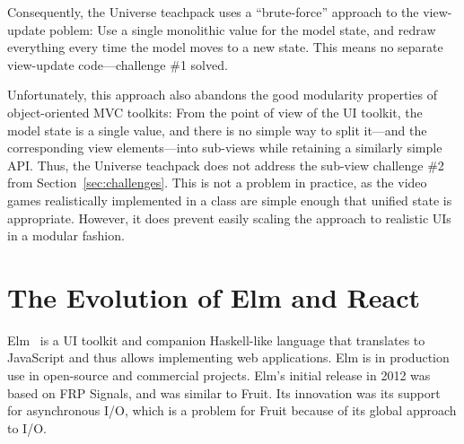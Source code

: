 \documentclass[sigplan,review,screen]{acmart}
\begin{document}
Consequently, the Universe teachpack uses a ``brute-force'' approach
to the view-update poblem: Use a single monolithic value for the model
state, and redraw everything every time the model moves to a new
state.  This means no separate view-update code---challenge \#1
solved.

Unfortunately, this approach also abandons the good modularity
properties of object-oriented MVC toolkits: From the point of view of
the UI toolkit, the model state is a single value, and there is no
simple way to split it---and the corresponding view elements---into
sub-views while retaining a similarly simple API.  Thus, the Universe
teachpack does not address the sub-view challenge \#2 from
Section~\ref{sec:challenges}.  This is not a
problem in practice, as the video games realistically implemented in
a class are simple enough that unified state is appropriate.  However,
it does prevent easily scaling the approach to realistic UIs in a
modular fashion.

\section{The Evolution of Elm and React}
\label{sec:elm-react}

Elm~\cite{Elm} is a UI toolkit and companion Haskell-like language
that translates to JavaScript and thus allows implementing web
applications.  Elm is in production use in open-source and
commercial projects.  Elm's initial release in 2012 was based on FRP Signals,
and was similar to Fruit.  Its innovation was its support for
asynchronous I/O, which is a problem for Fruit because of its global
approach to I/O.
\end{document}
